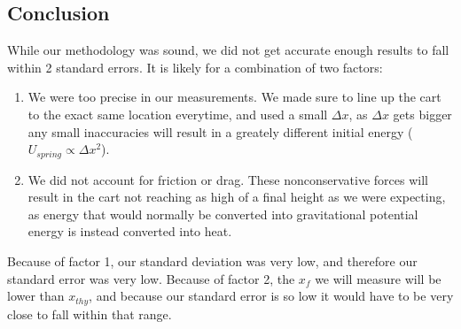 \documentclass[11pt, letterpaper, includehead]{article}
\begin{document}
\subsection{Conclusion}
While our methodology was sound, we did not get accurate enough results to fall within 
2 standard errors. It is likely for a combination of two factors:
\begin{enumerate}
  \item We were too precise in our measurements. We made sure to line up the cart to the exact same
        location everytime, and used a small $\Delta x$, as $\Delta x$ gets bigger any small inaccuracies
        will result in a greately different initial energy ($U_{spring} \propto \Delta x^2$).
  \item We did not account for friction or drag. These nonconservative forces will result
        in the cart not reaching as high of a final height as we were expecting, as energy 
        that would normally be converted into gravitational potential energy is instead converted
        into heat.
\end{enumerate}
Because of factor 1, our standard deviation was very low, and therefore our standard error was very low. Because
of factor 2, the $x_f$ we will measure will be lower than $x_{thy}$, and because our standard error is so low it
would have to be very close to fall within that range.
\end{document}
